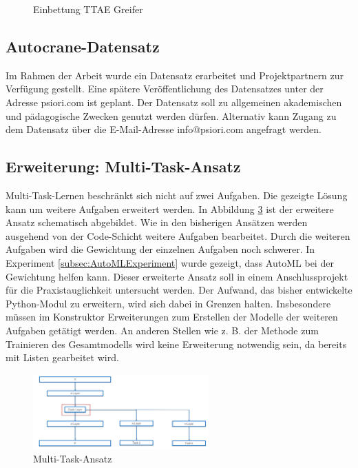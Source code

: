 \begin{figure}[h]
\begin{subfigure}[c]{0.6\textwidth}
 			\label{img:TTGrappleEinbettungVorhersage}	
 		\end{subfigure}
 		\caption{Einbettung TTAE Greifer}
 		\label{img:TTGrappleEmb}
 	\end{figure}
 	
	\subsection{Autocrane-Datensatz}
	\label{subsec:AutocraneDatensatz}	
	Im Rahmen der Arbeit wurde ein Datensatz erarbeitet und Projektpartnern zur Verfügung gestellt. Eine spätere Veröffentlichung des Datensatzes unter der Adresse psiori.com ist geplant. Der Datensatz soll zu allgemeinen akademischen und pädagogische Zwecken genutzt werden dürfen. Alternativ kann Zugang zu dem Datensatz über die E-Mail-Adresse info@psiori.com angefragt werden.

	\subsection{Erweiterung: Multi-Task-Ansatz}
	\label{subsec:MehrfacheAufgaben}
	Multi-Task-Lernen beschränkt sich nicht auf zwei Aufgaben. Die gezeigte Lösung kann um weitere Aufgaben erweitert werden. In Abbildung \ref{img:AusblickMultiTaskAnsatz} ist der erweitere Ansatz schematisch abgebildet. Wie in den bisherigen Ansätzen werden ausgehend von der Code-Schicht weitere Aufgaben bearbeitet. Durch die weiteren Aufgaben wird die Gewichtung der einzelnen Aufgaben noch schwerer. In Experiment \ref{subsec:AutoMLExperiment}  wurde gezeigt, dass AutoML bei der Gewichtung helfen kann. Dieser erweiterte Ansatz soll in einem Anschlussprojekt für die Praxistauglichkeit untersucht werden. Der Aufwand, das bisher entwickelte Python-Modul zu erweitern, wird sich dabei in Grenzen halten. Insbesondere müssen im Konstruktor Erweiterungen zum Erstellen der Modelle der weiteren Aufgaben getätigt werden. An anderen Stellen wie z. B. der Methode zum Trainieren des Gesamtmodells wird keine Erweiterung notwendig sein, da bereits mit Listen gearbeitet wird.
	\begin{figure}[h]
		\centering
		\includegraphics[width=0.6\textwidth, center]{bilder/FazitUndAusblick/MultiTaskAnsatz.PNG}
		\caption[Ausblick Multi-Task-Ansatz]{Multi-Task-Ansatz}
		\label{img:AusblickMultiTaskAnsatz}
	\end{figure}

